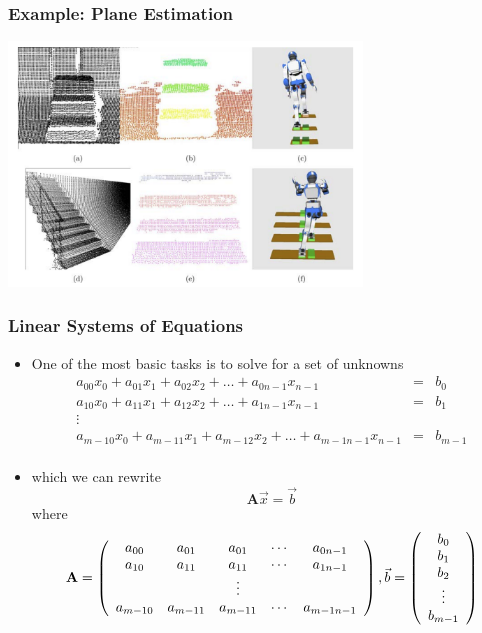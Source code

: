 \documentclass[10pt]{beamer}
\begin{document}
\begin{frame}
  \frametitle{Example: Plane Estimation}
  \centerline{\includegraphics[height=6.5cm]{plane-estimation}}
\end{frame}

\begin{frame}
  \frametitle{Linear Systems of Equations}
  \begin{itemize}
  \item One of the most basic tasks is to solve for a set of unknowns
    \[
      \begin{array}{ccc}
        a_{00} x_0 + a_{01} x_1 + a_{02} x_2 + \ldots + a_{0n-1} x_{n-1} & = & b_0\\
        a_{10} x_0 + a_{11} x_1 + a_{12} x_2 + \ldots + a_{1n-1} x_{n-1} & = & b_1\\
        \vdots && \\
        a_{m-10} x_0 + a_{m-11} x_1 + a_{m-12} x_2 + \ldots + a_{m-1n-1} x_{n-1} & = & b_{m-1}\\
      \end{array}
    \]
    \pause
  \item which we can rewrite
    \[
      \mathbf{A} \vec{x} = \vec{b}
    \]
    where
    \[
      \mathbf{A} = \left(
        \begin{array}{ccccc}
          a_{00} & a_{01} & a_{01} & \cdots & a_{0n-1} \\
          a_{10} & a_{11} & a_{11} & \cdots & a_{1n-1} \\
          & &  \vdots & & \\
          a_{m-10} & a_{m-11} & a_{m-11} & \cdots & a_{m-1n-1} \\
        \end{array}\right), 
      \vspace{1cm} 
      \vec{b} = \left(
        \begin{array}{c}
          b_0 \\ b_1 \\ b_2 \\ \vdots \\ b_{m-1} \\
        \end{array}\right)
    \]
  \end{itemize}
\end{frame}
\end{document}
